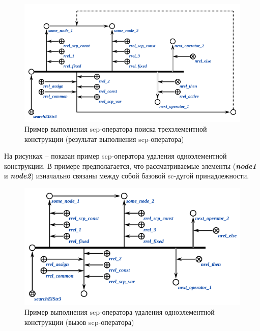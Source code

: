 \begin{figure}[H]
	\centering
	\includegraphics[scale=0.8]{images/part3/chapter_situation_management/searchElStr3_faf_2.png}
	\caption{Пример выполнения scp-оператора поиска трехэлементной конструкции (результат выполнения scp-оператора)}
	\label{fig:searchElStr3_faf_2}
\end{figure}

На рисунках \textit{} -- \textit{} показан пример scp-оператора удаления одноэлементной конструкции. В примере предполагается, что рассматриваемые элементы (\textbf{\textit{node1}} и \textbf{\textit{node2}}) изначально связаны между собой базовой sc-дугой принадлежности.

\begin{figure}[H]
	\centering
	\includegraphics[scale=0.8]{images/part3/chapter_situation_management/searchElStr3_faf.png}
	\caption{Пример выполнения scp-оператора удаления одноэлементной конструкции (вызов scp-оператора)}
	\label{fig:erase_edge}
\end{figure}

